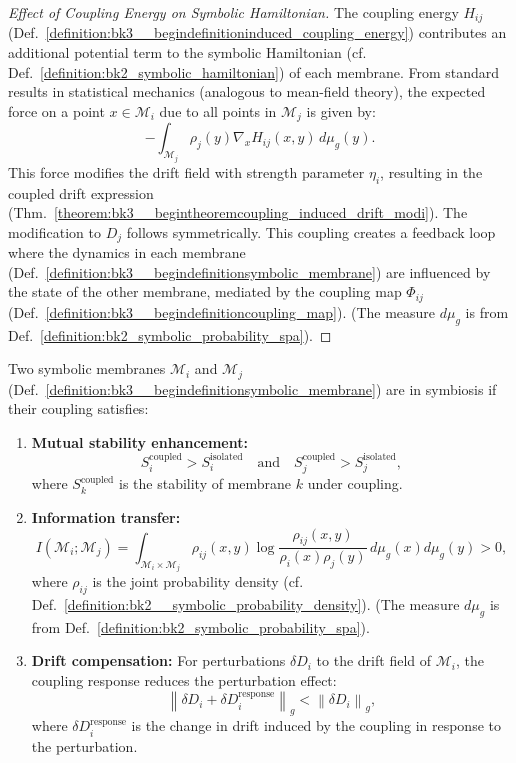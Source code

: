 \begin{proof}[Effect of Coupling Energy on Symbolic Hamiltonian]
\label{proof:bk3_coupling_energy_symbolic_hamiltonian}
The coupling energy \( H_{ij} \) (Def.~\ref{definition:bk3__begindefinitioninduced_coupling_energy}) contributes an additional potential term to the symbolic Hamiltonian (cf. Def.~\ref{definition:bk2_symbolic_hamiltonian}) of each membrane.
From standard results in statistical mechanics (analogous to mean-field theory), the expected force on a point \( x \in \mathcal{M}_i \) due to all points in \( \mathcal{M}_j \) is given by:
\[
-\int_{\mathcal{M}_j} \rho_j(y) \nabla_x H_{ij}(x, y) \, d\mu_g(y).
\]
This force modifies the drift field with strength parameter \( \eta_i \), resulting in the coupled drift expression (Thm.~\ref{theorem:bk3__begintheoremcoupling_induced_drift_modi}). The modification to \( D_j \) follows symmetrically.
This coupling creates a feedback loop where the dynamics in each membrane (Def.~\ref{definition:bk3__begindefinitionsymbolic_membrane}) are influenced by the state of the other membrane, mediated by the coupling map \( \Phi_{ij} \) (Def.~\ref{definition:bk3__begindefinitioncoupling_map}). (The measure $d\mu_g$ is from Def.~\ref{definition:bk2_symbolic_probability_spa}).
\end{proof}

\begin{definition} \label{definition:bk3_symbolic_symbiosis}
Two symbolic membranes $\mathcal{M}_i$ and $\mathcal{M}_j$ (Def.~\ref{definition:bk3__begindefinitionsymbolic_membrane}) are in symbiosis if their coupling satisfies:
\begin{enumerate}
    \item \textbf{Mutual stability enhancement:} 
    \[
    S_i^{\text{coupled}} > S_i^{\text{isolated}} \quad \text{and} \quad 
    S_j^{\text{coupled}} > S_j^{\text{isolated}},
    \]
    where \( S_k^{\text{coupled}} \) is the stability of membrane \( k \) under coupling.
    \item \textbf{Information transfer:} 
    \[
    I(\mathcal{M}_i; \mathcal{M}_j) = \int_{\mathcal{M}_i \times \mathcal{M}_j} 
    \rho_{ij}(x,y) \log \frac{\rho_{ij}(x,y)}{\rho_i(x) \rho_j(y)} \, d\mu_g(x) d\mu_g(y) > 0,
    \]
    where \( \rho_{ij} \) is the joint probability density (cf. Def.~\ref{definition:bk2__symbolic_probability_density}). (The measure $d\mu_g$ is from Def.~\ref{definition:bk2_symbolic_probability_spa}).
    \item \textbf{Drift compensation:} For perturbations \( \delta D_i \) to the drift field of \( \mathcal{M}_i \), the coupling response reduces the perturbation effect:
    \[
    \left\| \delta D_i + \delta D_i^{\text{response}} \right\|_g 
    < \left\| \delta D_i \right\|_g,
    \]
    where \( \delta D_i^{\text{response}} \) is the change in drift induced by the coupling in response to the perturbation.
\end{enumerate}
\end{definition}

